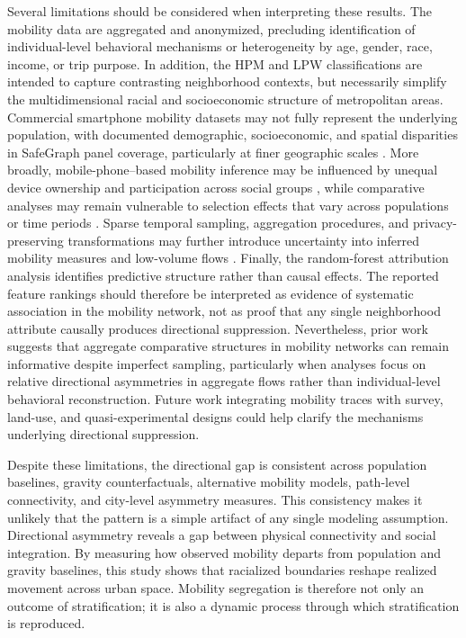 \documentclass[9pt,twocolumn,twoside]{pnas-new}
\begin{document}
Several limitations should be considered when interpreting these results. The mobility data are aggregated and anonymized, precluding identification of individual-level behavioral mechanisms or heterogeneity by age, gender, race, income, or trip purpose. In addition, the HPM and LPW classifications are intended to capture contrasting neighborhood contexts, but necessarily simplify the multidimensional racial and socioeconomic structure of metropolitan areas. Commercial smartphone mobility datasets may not fully represent the underlying population, with documented demographic, socioeconomic, and spatial disparities in SafeGraph panel coverage, particularly at finer geographic scales \cite{li2024understanding, coston2021leveraging}. More broadly, mobile-phone--based mobility inference may be influenced by unequal device ownership and participation across social groups \cite{wesolowski2013impact, arai2016comparative}, while comparative analyses may remain vulnerable to selection effects that vary across populations or time periods \cite{garber2022selection}. Sparse temporal sampling, aggregation procedures, and privacy-preserving transformations may further introduce uncertainty into inferred mobility measures and low-volume flows \cite{lu2017understanding, grantz2020use}. Finally, the random-forest attribution analysis identifies predictive structure rather than causal effects. The reported feature rankings should therefore be interpreted as evidence of systematic association in the mobility network, not as proof that any single neighborhood attribute causally produces directional suppression. Nevertheless, prior work suggests that aggregate comparative structures in mobility networks can remain informative despite imperfect sampling, particularly when analyses focus on relative directional asymmetries in aggregate flows rather than individual-level behavioral reconstruction. Future work integrating mobility traces with survey, land-use, and quasi-experimental designs could help clarify the mechanisms underlying directional suppression.

Despite these limitations, the directional gap is consistent across population baselines, gravity counterfactuals, alternative mobility models, path-level connectivity, and city-level asymmetry measures. This consistency makes it unlikely that the pattern is a simple artifact of any single modeling assumption. Directional asymmetry reveals a gap between physical connectivity and social integration. By measuring how observed mobility departs from population and gravity baselines, this study shows that racialized boundaries reshape realized movement across urban space. Mobility segregation is therefore not only an outcome of stratification; it is also a dynamic process through which stratification is reproduced.
\end{document}
